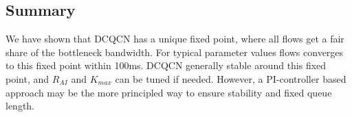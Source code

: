 \subsection{Summary}
We have shown that DCQCN has a unique fixed point, where all flows get a fair
share of the bottleneck bandwidth. For typical parameter values flows converges
to this fixed point within 100ms. DCQCN generally stable around this fixed
point, and $R_{AI}$ and $K_{max}$ can be tuned if needed.  However, a
PI-controller based approach may be the more principled way to ensure stability
and fixed queue length.
